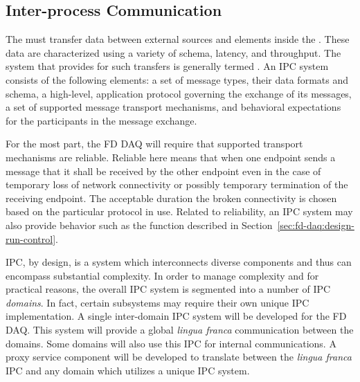   



\subsection{Inter-process Communication}
\label{sec:daq:design-ipc}

The  must transfer data between external sources and elements inside the . 
These data are characterized using a variety of schema, latency, and throughput. 
The system that provides for such transfers is generally termed .
An IPC system consists of the following elements:
a set of message types, their data formats and schema,
a high-level, application protocol governing the exchange of its messages,
a set of supported message transport mechanisms, and
behavioral expectations for the participants in the message exchange. 


For the most part, the FD DAQ will require that supported transport mechanisms are reliable. 
Reliable here means that when one endpoint sends a message that it shall be received by the other endpoint even in the case of temporary loss of network connectivity or possibly temporary termination of the receiving endpoint.
The acceptable duration the broken connectivity is chosen based on the particular protocol in use.
Related to reliability, an IPC system may also provide behavior such as the  function described in Section~\ref{sec:fd-daq:design-run-control}.

IPC, by design, is a system which interconnects diverse components and thus can encompass substantial complexity. 
In order to manage complexity and for practical reasons, the overall IPC system is segmented into a number of IPC \textit{domains}. 
In fact, certain  subsystems may require their own unique IPC implementation.
A single inter-domain IPC system will be developed for the FD DAQ. 
This system will provide a global \textit{lingua franca} communication between the domains. 
Some domains will also use this IPC for internal communications. 
A proxy service component will be developed to translate between the \textit{lingua franca} IPC and any domain which utilizes a unique IPC system.

